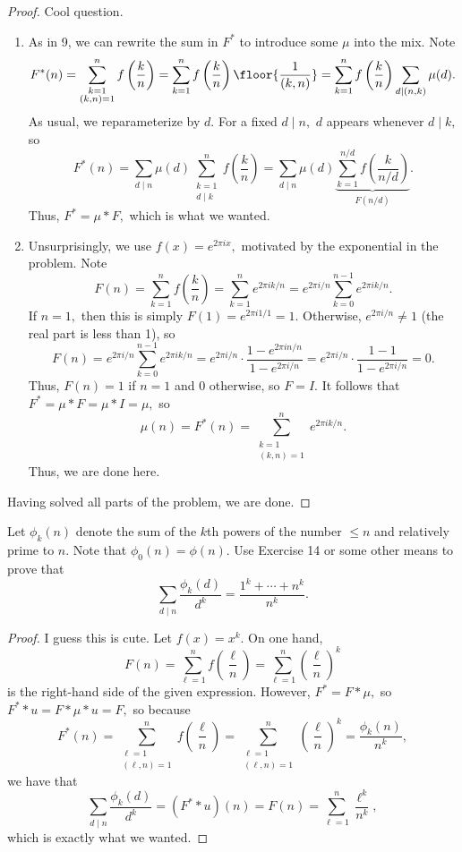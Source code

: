 \begin{proof}
Cool question.
\begin{enumerate}[label=(\alph*)]
    \item As in 9, we can rewrite the sum in $F^*$ to introduce some $\mu$ into the mix. Note
    \[F^*(n)=\sum_{\substack{k=1\\(k,n)=1}}^nf\left(\frac kn\right)=\sum_{k=1}^nf\left(\frac kn\right)\floor{\frac1{(k,n)}}=\sum_{k=1}^nf\left(\frac kn\right)\sum_{d\mid(n,k)}\mu(d).\]
    As usual, we reparameterize by $d.$ For a fixed $d\mid n,$ $d$ appears whenever $d\mid k,$ so
    \[F^*(n)=\sum_{d\mid n}\mu(d)\sum_{\substack{k=1\\d\mid k}}^nf\left(\frac kn\right)=\sum_{d\mid n}\mu(d)\underbrace{\sum_{k=1}^{n/d}f\left(\frac k{n/d}\right)}_{F(n/d)}.\]
    Thus, $F^*=\mu*F,$ which is what we wanted.
    \item Unsurprisingly, we use $f(x)=e^{2\pi ix},$ motivated by the exponential in the problem. Note
    \[F(n)=\sum_{k=1}^nf\left(\frac kn\right)=\sum_{k=1}^ne^{2\pi ik/n}=e^{2\pi i/n}\sum_{k=0}^{n-1}e^{2\pi ik/n}.\]
    If $n=1,$ then this is simply $F(1)=e^{2\pi i1/1}=1.$ Otherwise, $e^{2\pi i/n}\ne1$ (the real part is less than 1), so
    \[F(n)=e^{2\pi i/n}\sum_{k=0}^{n-1}e^{2\pi ik/n}=e^{2\pi i/n}\cdot\frac{1-e^{2\pi in/n}}{1-e^{2\pi i/n}}=e^{2\pi i/n}\cdot\frac{1-1}{1-e^{2\pi i/n}}=0.\]
    Thus, $F(n)=1$ if $n=1$ and 0 otherwise, so $F=I.$ It follows that $F^*=\mu*F=\mu*I=\mu,$ so
    \[\mu(n)=F^*(n)=\sum_{\substack{k=1\\(k,n)=1}}^ne^{2\pi ik/n}.\]
    Thus, we are done here.
\end{enumerate}
Having solved all parts of the problem, we are done.
\end{proof}

\begin{exercise}
Let $\phi_k(n)$ denote the sum of the $k$th powers of the number $\le n$ and relatively prime to $n.$ Note that $\phi_0(n)=\phi(n).$ Use Exercise 14 or some other means to prove that
\[\sum_{d\mid n}\frac{\phi_k(d)}{d^k}=\frac{1^k+\cdots+n^k}{n^k}.\]
\end{exercise}

\begin{proof}
I guess this is cute. Let $f(x)=x^k.$ On one hand,
\[F(n)=\sum_{\ell=1}^nf\left(\frac\ell n\right)=\sum_{\ell=1}^n\left(\frac\ell n\right)^k\]
is the right-hand side of the given expression. However, $F^*=F*\mu,$ so $F^**u=F*\mu*u=F,$ so because
\[F^*(n)=\sum_{\substack{\ell=1\\(\ell,n)=1}}^nf\left(\frac\ell n\right)=\sum_{\substack{\ell=1\\(\ell,n)=1}}^n\left(\frac\ell n\right)^k=\frac{\phi_k(n)}{n^k},\]
we have that
\[\sum_{d\mid n}\frac{\phi_k(d)}{d^k}=(F^**u)(n)=F(n)=\sum_{\ell=1}^n\frac{\ell^k}{n^k},\]
which is exactly what we wanted.
\end{proof}


